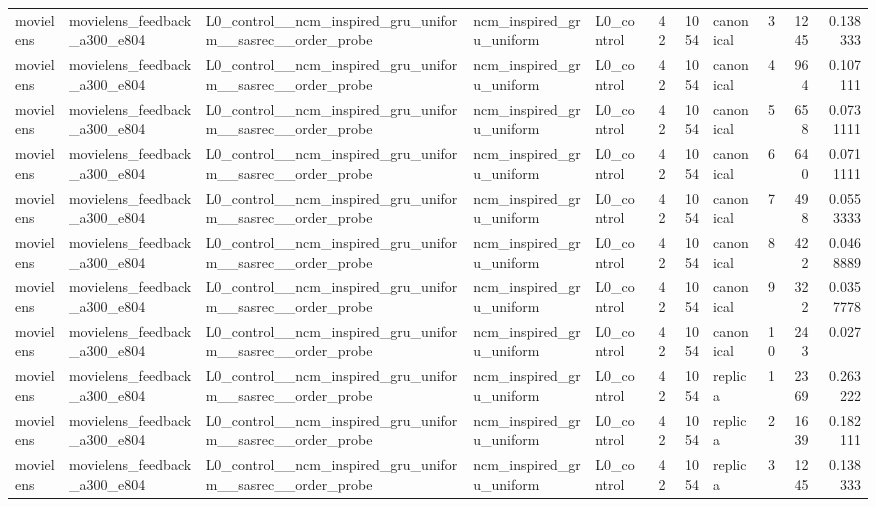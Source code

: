 \begin{table}[htbp!]
\begin{tabular}{lllllrrlrrr}
movielens & movielens\_feedback\_a300\_e804 & L0\_control\_\_ncm\_inspired\_gru\_uniform\_\_sasrec\_\_order\_probe & ncm\_inspired\_gru\_uniform & L0\_control & 42 & 1054 & canonical & 3 & 1245 & 0.138333 \\
movielens & movielens\_feedback\_a300\_e804 & L0\_control\_\_ncm\_inspired\_gru\_uniform\_\_sasrec\_\_order\_probe & ncm\_inspired\_gru\_uniform & L0\_control & 42 & 1054 & canonical & 4 & 964 & 0.107111 \\
movielens & movielens\_feedback\_a300\_e804 & L0\_control\_\_ncm\_inspired\_gru\_uniform\_\_sasrec\_\_order\_probe & ncm\_inspired\_gru\_uniform & L0\_control & 42 & 1054 & canonical & 5 & 658 & 0.0731111 \\
movielens & movielens\_feedback\_a300\_e804 & L0\_control\_\_ncm\_inspired\_gru\_uniform\_\_sasrec\_\_order\_probe & ncm\_inspired\_gru\_uniform & L0\_control & 42 & 1054 & canonical & 6 & 640 & 0.0711111 \\
movielens & movielens\_feedback\_a300\_e804 & L0\_control\_\_ncm\_inspired\_gru\_uniform\_\_sasrec\_\_order\_probe & ncm\_inspired\_gru\_uniform & L0\_control & 42 & 1054 & canonical & 7 & 498 & 0.0553333 \\
movielens & movielens\_feedback\_a300\_e804 & L0\_control\_\_ncm\_inspired\_gru\_uniform\_\_sasrec\_\_order\_probe & ncm\_inspired\_gru\_uniform & L0\_control & 42 & 1054 & canonical & 8 & 422 & 0.0468889 \\
movielens & movielens\_feedback\_a300\_e804 & L0\_control\_\_ncm\_inspired\_gru\_uniform\_\_sasrec\_\_order\_probe & ncm\_inspired\_gru\_uniform & L0\_control & 42 & 1054 & canonical & 9 & 322 & 0.0357778 \\
movielens & movielens\_feedback\_a300\_e804 & L0\_control\_\_ncm\_inspired\_gru\_uniform\_\_sasrec\_\_order\_probe & ncm\_inspired\_gru\_uniform & L0\_control & 42 & 1054 & canonical & 10 & 243 & 0.027 \\
movielens & movielens\_feedback\_a300\_e804 & L0\_control\_\_ncm\_inspired\_gru\_uniform\_\_sasrec\_\_order\_probe & ncm\_inspired\_gru\_uniform & L0\_control & 42 & 1054 & replica & 1 & 2369 & 0.263222 \\
movielens & movielens\_feedback\_a300\_e804 & L0\_control\_\_ncm\_inspired\_gru\_uniform\_\_sasrec\_\_order\_probe & ncm\_inspired\_gru\_uniform & L0\_control & 42 & 1054 & replica & 2 & 1639 & 0.182111 \\
movielens & movielens\_feedback\_a300\_e804 & L0\_control\_\_ncm\_inspired\_gru\_uniform\_\_sasrec\_\_order\_probe & ncm\_inspired\_gru\_uniform & L0\_control & 42 & 1054 & replica & 3 & 1245 & 0.138333 \\

\end{tabular}
\end{table}

